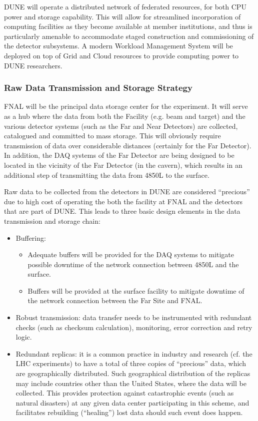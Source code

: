 DUNE will operate a  distributed network of federated resources, for both CPU power and storage capability. This will allow for streamlined incorporation
of computing facilities as they become available at member institutions, and thus is particularly amenable to accommodate staged construction and commissioning
of the detector subsystems. A modern Workload Management System will be deployed on top of Grid and Cloud resources to provide computing
power to DUNE researchers.

\subsubsection{Raw Data Transmission and Storage Strategy}
FNAL will be the principal data storage center for the experiment. It will serve as a hub where the data from both the Facility (e.g. beam and target)
and the various detector systems (such as the  Far and Near Detectors)  are collected, catalogued and committed to mass storage. This will obviously require transmission of
data over considerable distances (certainly for the Far Detector). In addition, the DAQ systems of the Far Detector are being designed to be located  in the vicinity of
the Far Detector (in the cavern), which results in an additional step of transmitting the data from 4850L to the surface.

Raw data to be collected from the detectors in DUNE are considered ``precious'' due to high cost of operating the both the facility at FNAL
and the detectors that are part of DUNE. This leads to three basic design elements in the data transmission and storage chain:
\begin{itemize}
\item Buffering:
\begin{itemize}
\item Adequate buffers will be provided for the DAQ systems  to mitigate possible downtime of the network connection between 4850L and the surface.
\item Buffers will be provided at the surface facility to mitigate downtime of the network connection between the Far Site and FNAL.
\end{itemize}
\item Robust transmission: data transfer needs to be instrumented with redundant checks (such as checksum calculation), monitoring, error correction and retry logic.
\item Redundant replicas: it is a common practice in industry and research (cf. the LHC experiments)
to have a total of three copies of ``precious'' data, which are geographically distributed.
Such geographical distribution of the replicas may include countries other than the United States, where the data will be collected.
This provides protection against catastrophic events (such as natural disasters) at any given data center participating in this scheme, and facilitates rebuilding (``healing'')  lost data should such event does happen.
\end{itemize}


